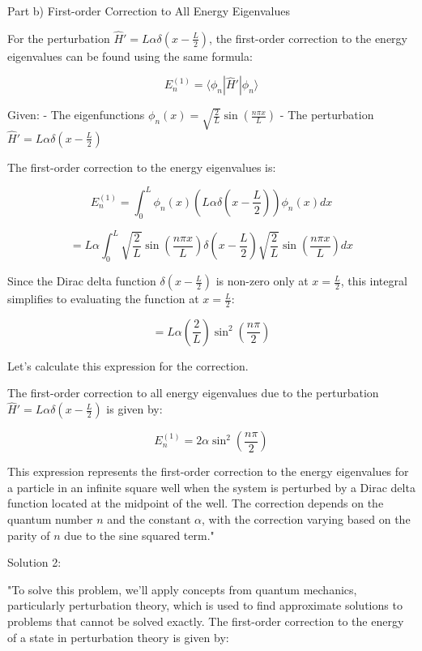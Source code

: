 Part b) First-order Correction to All Energy Eigenvalues

For the perturbation \( \hat{H}' = L\alpha \delta\left(x - \frac{L}{2} \right) \), the first-order correction to the energy eigenvalues can be found using the same formula:

\[ E_n^{(1)} = \langle \phi_n | \hat{H}' | \phi_n \rangle \]

Given:
- The eigenfunctions \( \phi_{n}(x) = \sqrt{\frac{2}{L}} \sin\left(\frac{n \pi x}{L} \right) \)
- The perturbation \( \hat{H}' = L\alpha \delta\left(x - \frac{L}{2} \right) \)

The first-order correction to the energy eigenvalues is:

\[ E_n^{(1)} = \int_0^L \phi_n(x) \left(L\alpha \delta\left(x - \frac{L}{2} \right)\right) \phi_n(x) dx \]

\[ = L\alpha \int_0^L \sqrt{\frac{2}{L}} \sin\left(\frac{n \pi x}{L} \right) \delta\left(x - \frac{L}{2} \right) \sqrt{\frac{2}{L}} \sin\left(\frac{n \pi x}{L} \right) dx \]

Since the Dirac delta function \( \delta\left(x - \frac{L}{2} \right) \) is non-zero only at \( x = \frac{L}{2} \), this integral simplifies to evaluating the function at \( x = \frac{L}{2} \):

\[ = L\alpha \left(\frac{2}{L}\right) \sin^2\left(\frac{n \pi}{2}\right) \]

Let's calculate this expression for the correction.

The first-order correction to all energy eigenvalues due to the perturbation \( \hat{H}' = L\alpha \delta\left(x - \frac{L}{2} \right) \) is given by:

\[ E_n^{(1)} = 2\alpha \sin^2\left(\frac{n \pi}{2}\right) \]

This expression represents the first-order correction to the energy eigenvalues for a particle in an infinite square well when the system is perturbed by a Dirac delta function located at the midpoint of the well. The correction depends on the quantum number \( n \) and the constant \( \alpha \), with the correction varying based on the parity of \( n \) due to the sine squared term."

Solution 2: 

"To solve this problem, we'll apply concepts from quantum mechanics, particularly perturbation theory, which is used to find approximate solutions to problems that cannot be solved exactly. The first-order correction to the energy of a state in perturbation theory is given by:

